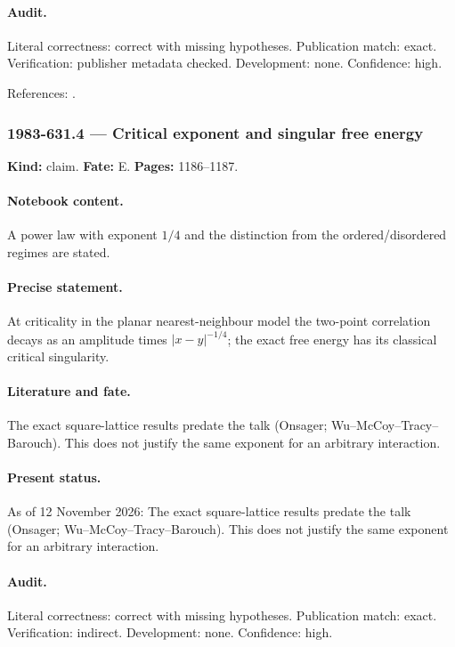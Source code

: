 \paragraph{Audit.} Literal correctness: correct with missing hypotheses. Publication match: exact. Verification: publisher metadata checked. Development: none. Confidence: high.

\noindent References: \citep{yang1952magnetization}.\par

\subsubsection{1983-631.4 --- Critical exponent and singular free energy}

\label{item:1983-631.4}

\noindent\textbf{Kind:} claim. \textbf{Fate:} E. \textbf{Pages:} 1186--1187.\par

\paragraph{Notebook content.} A power law with exponent \(1/4\) and the distinction from the ordered/disordered regimes are stated.

\paragraph{Precise statement.} At criticality in the planar nearest-neighbour model the two-point correlation decays as an amplitude times \(|x-y|^{-1/4}\); the exact free energy has its classical critical singularity.

\paragraph{Literature and fate.} The exact square-lattice results predate the talk (Onsager; Wu--McCoy--Tracy--Barouch). This does not justify the same exponent for an arbitrary interaction.

\paragraph{Present status.} As of 12 November 2026: The exact square-lattice results predate the talk (Onsager; Wu--McCoy--Tracy--Barouch). This does not justify the same exponent for an arbitrary interaction.

\paragraph{Audit.} Literal correctness: correct with missing hypotheses. Publication match: exact. Verification: indirect. Development: none. Confidence: high.

